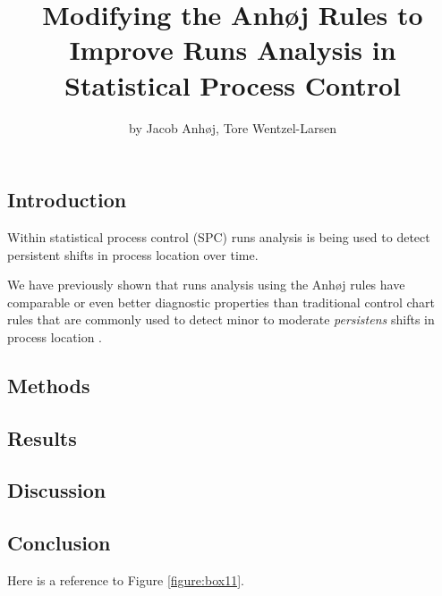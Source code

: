 \title{Modifying the Anhøj Rules to Improve Runs Analysis in Statistical
Process Control}
\author{by Jacob Anhøj, Tore Wentzel-Larsen}

\maketitle



\hypertarget{introduction}{%
\subsection{Introduction}\label{introduction}}

Within statistical process control (SPC) runs analysis is being used to
detect persistent shifts in process location over time.

We have previously shown that runs analysis using the Anhøj rules have
comparable or even better diagnostic properties than traditional control
chart rules that are commonly used to detect minor to moderate
\emph{persistens} shifts in process location \citep{anhoej2018}.

\hypertarget{methods}{%
\subsection{Methods}\label{methods}}

\hypertarget{results}{%
\subsection{Results}\label{results}}

\hypertarget{discussion}{%
\subsection{Discussion}\label{discussion}}

\hypertarget{conclusion}{%
\subsection{Conclusion}\label{conclusion}}

Here is a reference to Figure \ref{figure:box11}.

